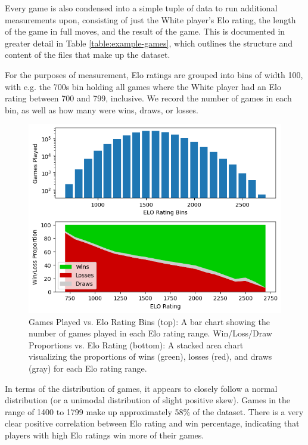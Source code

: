 \documentclass[conference]{IEEEtran}
\begin{document}
Every game is also condensed into a simple tuple of data to run additional measurements upon, consisting of just the White player's Elo rating, the length of the game in full moves, and the result of the game. This is documented in greater detail in Table \ref{table:example-games}, which outlines the structure and content of the files that make up the dataset.

For the purposes of measurement, Elo ratings are grouped into bins of width 100, with e.g. the 700s bin holding all games where the White player had an Elo rating between 700 and 799, inclusive. We record the number of games in each bin, as well as how many were wins, draws, or losses.

\begin{figure}[htbp]
\centerline{\includegraphics[scale=0.5]{Distribution and Win-Loss Proportion by Elo.png}}
\caption{Games Played vs. Elo Rating Bins (top): A bar chart showing the number of games played in each Elo rating range.
Win/Loss/Draw Proportions vs. Elo Rating (bottom): A stacked area chart visualizing the proportions of wins (green), losses (red), and draws (gray) for each Elo rating range.}
\label{fig:wl-prop}
\end{figure}

In terms of the distribution of games, it appears to closely follow a normal distribution (or a unimodal distribution of slight positive skew). Games in the range of 1400 to 1799 make up approximately 58\% of the dataset. There is a very clear positive correlation between Elo rating and win percentage, indicating that players with high Elo ratings win more of their games.
\end{document}
